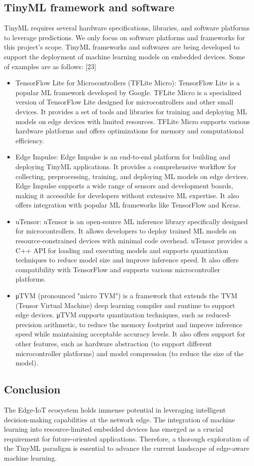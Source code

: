 \subsection{TinyML framework and software}
\indent TinyML requires several hardware specifications, libraries, and software platforms to leverage predictions. We only focus on software platforms and frameworks for this project's scope.
TinyML frameworks and softwares are being developed to support the deployment of machine learning models on embedded devices. Some of examples are as follows: [23]
\begin{itemize}
    \item TensorFlow Lite for Microcontrollers (TFLite Micro): TensorFlow Lite is a popular ML framework developed by Google. TFLite Micro is a specialized version of TensorFlow Lite designed for microcontrollers and other small devices. It provides a set of tools and libraries for training and deploying ML models on edge devices with limited resources. TFLite Micro supports various hardware platforms and offers optimizations for memory and computational efficiency.
    \item Edge Impulse: Edge Impulse is an end-to-end platform for building and deploying TinyML applications. It provides a comprehensive workflow for collecting, preprocessing, training, and deploying ML models on edge devices. Edge Impulse supports a wide range of sensors and development boards, making it accessible for developers without extensive ML expertise. It also offers integration with popular ML frameworks like TensorFlow and Keras.
    \item uTensor: uTensor is an open-source ML inference library specifically designed for microcontrollers. It allows developers to deploy trained ML models on resource-constrained devices with minimal code overhead. uTensor provides a C++ API for loading and executing models and supports quantization techniques to reduce model size and improve inference speed. It also offers compatibility with TensorFlow and supports various microcontroller platforms.
    \item μTVM (pronounced "micro TVM") is a framework that extends the TVM (Tensor Virtual Machine) deep learning compiler and runtime to support edge devices. μTVM supports quantization techniques, such as reduced-precision arithmetic, to reduce the memory footprint and improve inference speed while maintaining acceptable accuracy levels. It also offers support for other features, such as hardware abstraction (to support different microcontroller platforms) and model compression (to reduce the size of the model).
\end{itemize}

\subsection{Conclusion}
\indent The Edge-IoT ecosystem holds immense potential in leveraging intelligent decision-making capabilities at the network edge. The integration of machine learning into resource-limited embedded devices has emerged as a crucial requirement for future-oriented applications. 
Therefore, a thorough exploration of the TinyML paradigm is essential to advance the current landscape of edge-aware machine learning.
